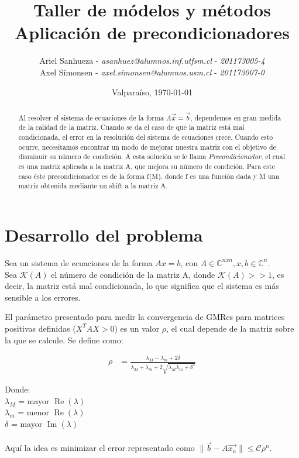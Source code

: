 \documentclass[fleqn]{article}
\title{\textbf{Taller de módelos y métodos}\\Aplicación de precondicionadores}
\author{Ariel Sanhueza - \textit{asanhuez@alumnos.inf.utfsm.cl} - \textit{201173005-4}\\
{Axel Símonsen - \textit{axel.simonsen@alumnos.usm.cl} - \textit{201173007-0}}}
\date{\vspace*{1cm} Valparaíso, \today}
\begin{document}
\maketitle

\begin{abstract}
Al resolver el sistema de ecuaciones de la forma $A\vec{x}=\vec{b}$, dependemos en gran medida de la calidad de la matriz. Cuando se da el caso de que la matriz está mal condicionada, el error en la resolución del sistema de ecuaciones crece. Cuando esto ocurre, necesitamos encontrar un modo de mejorar nuestra matriz con el objetivo de disminuir su número de condición. A esta solución se le llama \emph{Precondicionador}, el cual es una matriz aplicada a la matriz A, que mejora su número de condición. Para este caso éste precondicionador es de la forma f(M), donde f es una función dada y M una matriz obtenida mediante un shift a la matriz A.
\end{abstract}

\section{Desarrollo del problema}

Sea un sistema de ecuaciones de la forma $Ax = b$, con $A \in \mathbb{C}^{nxn}, x, b \in \mathbb{C}^{n}$.\\
Sea $\mathcal{K}(A)$ el número de condición de la matriz A, donde
$\mathcal{K}(A) >> 1$, es decir, la matriz está mal condicionada, lo que significa que el sistema es más sensible a los errores.

El parámetro presentado para medir la convergencia de GMRes para matrices positivas definidas ($X^TAX > 0$) es un valor $\rho$, el cual depende de la matriz sobre la que se calcule. Se define como:

\begin{align*}
\rho &= \frac{\lambda_M - \lambda_m + 2\delta}{\lambda_M + \lambda_m + 2\sqrt{\lambda_M \lambda_m + \delta^2}}
\end{align*}


Donde:\\
$\lambda_{M}$ = mayor $\operatorname{Re}(\lambda)$\\
$\lambda_{m}$ = menor $\operatorname{Re}(\lambda)$\\
$\delta$ = mayor $\operatorname{Im}(\lambda)$\\
\\

Aquí la idea es minimizar el error representado como
$ \|\vec{b} - A\vec{x_{n}}\| \le \mathcal{C}\rho^n$.
\end{document}
